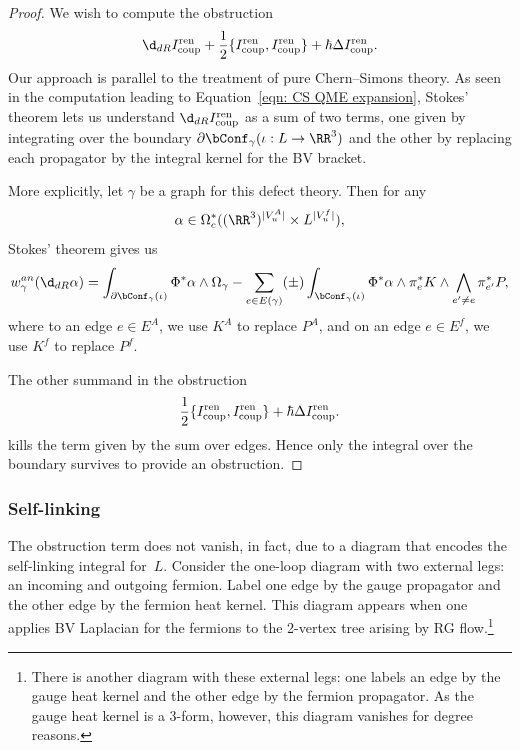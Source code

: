\documentclass[10pt]{amsart}
\begin{document}
\begin{proof}
We wish to compute the obstruction
\[
\d_{dR} I^{\rm ren}_{\rm coup} + \frac{1}{2} \{I^{\rm ren}_{\rm coup},I^{\rm ren}_{\rm coup}\} + \hbar \Delta I^{\rm ren}_{\rm coup} .
\]
Our approach is parallel to the treatment of pure Chern--Simons theory.
As seen in the computation leading to Equation~\eqref{eqn: CS QME expansion},
Stokes' theorem lets us understand $\d_{dR}I_{\rm coup}^{\rm ren}$ as a sum of two terms,
one given by integrating over the boundary $\partial\bConf_{\gamma}(\iota: L \to \RR^3)$ 
and the other by replacing each propagator by the integral kernel for the BV bracket.

More explicitly, let $\gamma$ be a graph for this defect theory. 
Then for any 
\[
\alpha \in \Omega^*_c((\RR^3)^{|V_u^A|} \times  L^{|V_u^f|}),
\]
Stokes' theorem gives us
\[
w^{an}_\gamma(\d_{dR} \alpha)  = \int_{\partial\bConf_{\gamma}(\iota)} \Phi^*\alpha \wedge \Omega_\gamma
- \sum_{e \in E(\gamma)} (\pm) \int_{\bConf_{\gamma}(\iota)} \Phi^*\alpha \wedge \pi_e^*K \wedge \bigwedge_{e' \neq e} \pi_{e'}^* P,
\]
where to an edge $e \in E^A$, we use $K^A$ to replace $P^A$, 
and on an edge $e \in E^f$, we use $K^f$ to replace $P^f$.

The other summand in the obstruction
\begin{equation}\label{eqn: second part of QME}
\frac{1}{2}\{I^{\rm ren}_{\rm coup},I^{\rm ren}_{\rm coup}\} + \hbar \Delta I^{\rm ren}_{\rm coup}.
\end{equation}
kills the term given by the sum over edges.
Hence only the integral over the boundary survives to provide an obstruction.
\end{proof}

\subsubsection{Self-linking}

The obstruction term does not vanish, in fact, 
due to a diagram that encodes the self-linking integral for~$L$.
Consider the one-loop diagram with two external legs: an incoming and outgoing fermion.
Label one edge by the gauge propagator and the other edge by the fermion heat kernel.
This diagram appears when one applies BV Laplacian for the fermions to the 2-vertex tree arising by RG flow.\footnote{There is another diagram with these external legs: one labels an edge by the gauge heat kernel and the other edge by the fermion propagator. As the gauge heat kernel is a 3-form, however, this diagram vanishes for degree reasons.}
\end{document}

